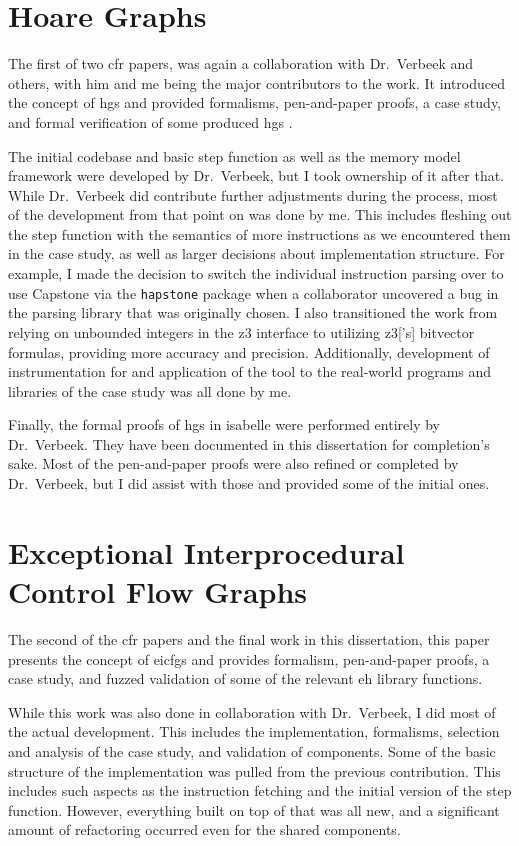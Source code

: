 \section*{Hoare Graphs}
The first of two \ac{cfr} papers,  was again a collaboration with Dr.~Verbeek and others, with him and me being the major contributors to the work.
It introduced the concept of \acp{hg} and provided formalisms, pen-and-paper proofs, a case study, and formal verification of some produced \acp{hg} \autocite{verbeek2022lifting}.

The initial codebase and basic step function as well as the memory model framework were developed by Dr.~Verbeek, but I took ownership of it after that.
While Dr.~Verbeek did contribute further adjustments during the process, most of the development from that point on was done by me.
This includes fleshing out the step function with the semantics of more instructions as we encountered them in the case study, as well as larger decisions about implementation structure.
For example, I made the decision to switch the individual instruction parsing over to use Capstone \autocite{capstone} via the \texttt{hapstone} package \autocite{hapstone} when a collaborator uncovered a bug in the parsing library that was originally chosen.
I also transitioned the work from relying on unbounded integers in the \gls{z3} interface to utilizing \gls{z3}['s] bitvector formulas, providing more accuracy and precision.
Additionally, development of instrumentation for and application of the tool to the real-world programs and libraries of the case study was all done by me.

Finally, the formal proofs of \acp{hg} in \gls{isabelle} were performed entirely by Dr.~Verbeek.
They have been documented in this dissertation for completion's sake.
Most of the pen-and-paper proofs were also refined or completed by Dr.~Verbeek, but I did assist with those and provided some of the initial ones.

\section*{Exceptional Interprocedural Control Flow Graphs}
The second of the \ac{cfr} papers and the final work in this dissertation, this paper presents the concept of \acp{eicfg} and provides formalism, pen-and-paper proofs, a case study, and fuzzed validation of some of the relevant \ac{eh} library functions.

While this work was also done in collaboration with Dr.~Verbeek, I did most of the actual development.
This includes the implementation, formalisms, selection and analysis of the case study, and validation of components.
Some of the basic structure of the implementation was pulled from the previous contribution.
This includes such aspects as the instruction fetching and the initial version of the step function.
However, everything built on top of that was all new, and a significant amount of refactoring occurred even for the shared components.
